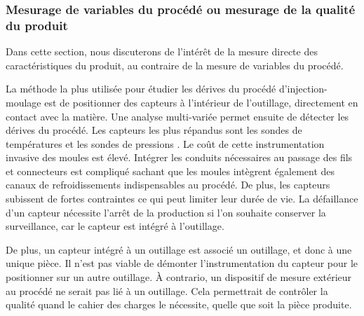 \subsubsection{Mesurage de variables du procédé ou mesurage de la qualité du produit}
Dans cette section, nous discuterons de l'intérêt de la mesure directe des caractéristiques du produit, au contraire de la mesure de variables du procédé.

La méthode la plus utilisée pour étudier les dérives du procédé d'injection-moulage est de positionner des capteurs à l’intérieur de l'outillage, directement en contact avec la matière.
Une analyse multi-variée permet ensuite de détecter les dérives du procédé.
Les capteurs les plus répandus sont les sondes de températures et les sondes de pressions \cite{kurt_experimental_2009}.
Le coût de cette instrumentation invasive des moules est élevé.
Intégrer les conduits nécessaires au passage des fils et connecteurs est compliqué sachant que les moules intègrent également des canaux de refroidissements indispensables au procédé.
De plus, les capteurs subissent de fortes contraintes ce qui peut limiter leur durée de vie.
La défaillance d'un capteur nécessite l'arrêt de la production si l'on souhaite conserver la surveillance, car le capteur est intégré à l'outillage.

De plus, un capteur intégré à un outillage est associé un outillage, et donc à une unique pièce.
Il n'est pas viable de démonter l'instrumentation du capteur pour le positionner sur un autre outillage.
À contrario, un dispositif de mesure extérieur au procédé ne serait pas lié à un outillage.
Cela permettrait de contrôler la qualité quand le cahier des charges le nécessite, quelle que soit la pièce produite.

